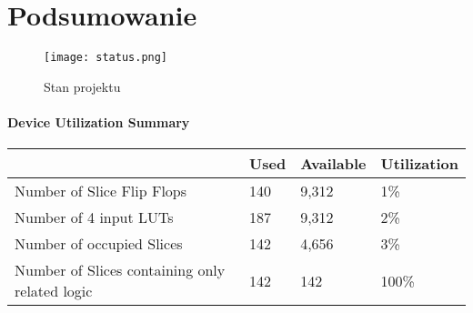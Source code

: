 \documentclass[11pt]{report}
\begin{document}
 \section{Podsumowanie}

\begin{figure}[hbt!]
    	\centering
    	\texttt{[image: status.png]}
    	\caption{Stan projektu}
	    \label{fig:1}
    \end{figure}

     \vspace{10mm} %
    
    
    \begin{table}[hbt!]
    \paragraph{Device Utilization Summary }
     \vspace{5mm} %
    \begin{tabular}{|l|l|l|l|}
    \hline
    \rowcolor[HTML]{FFFE65} 
    \multicolumn{1}{|c|}{\cellcolor[HTML]{FFFE65}\textbf{Logic Utilization}} & \multicolumn{1}{c|}{\cellcolor[HTML]{FFFE65}\textbf{Used}} & \multicolumn{1}{c|}{\cellcolor[HTML]{FFFE65}\textbf{Available}} & \multicolumn{1}{c|}{\cellcolor[HTML]{FFFE65}\textbf{Utilization}} \\ \hline
    Number of Slice Flip Flops                                 & 140                                                        & 9,312                                                           & 1\%                                                               \\ \hline
    Number of 4 input LUTs                                     & 187                                                        & 9,312                                                           & 2\%                                                               \\ \hline
    Number of occupied Slices                                  & 142                                                        & 4,656                                                           & 3\%                                                               \\ \hline
    Number of Slices containing only related logic             & 142                                                        & 142                                                             & 100\%                                                             \\ \hline

\end{tabular}
\end{table}
\end{document}
